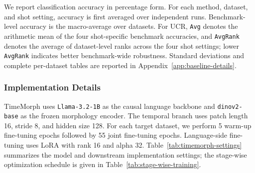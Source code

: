 \documentclass[10pt,journal,compsoc]{IEEEtran}
\begin{document}
We report classification accuracy in percentage form.
For each method, dataset, and shot setting, accuracy is first averaged over independent runs.
Benchmark-level accuracy is the macro-average over datasets.
For UCR, \texttt{Avg} denotes the arithmetic mean of the four shot-specific benchmark accuracies, and \texttt{AvgRank} denotes the average of dataset-level ranks across the four shot settings; lower \texttt{AvgRank} indicates better benchmark-wide robustness.
Standard deviations and complete per-dataset tables are reported in Appendix~\ref{app:baseline-details}.

\subsubsection{Implementation Details}
TimeMorph uses \texttt{Llama-3.2-1B} as the causal language backbone and \texttt{dinov2-base} as the frozen morphology encoder.
The temporal branch uses patch length 16, stride 8, and hidden size 128.
For each target dataset, we perform 5 warm-up fine-tuning epochs followed by 55 joint fine-tuning epochs.
Language-side fine-tuning uses LoRA with rank 16 and alpha 32.
Table~\ref{tab:timemorph-settings} summarizes the model and downstream implementation settings; the stage-wise optimization schedule is given in Table~\ref{tab:stage-wise-training}.
\end{document}
